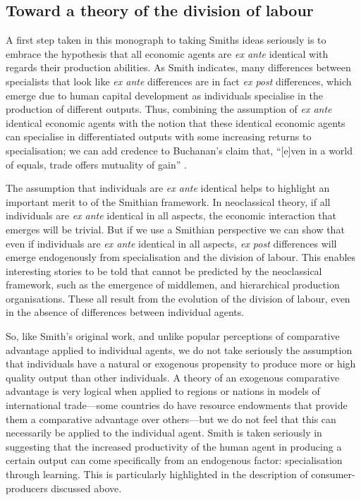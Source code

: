 \subsection{Toward a theory of the division of labour}

A first step taken in this monograph to taking Smiths ideas seriously is to embrace the hypothesis that all economic agents are \textit{ex ante} identical with regards their production abilities. As Smith indicates, many differences between specialists that look like \textit{ex ante} differences are in fact \textit{ex post} differences, which emerge due to human capital development as individuals specialise in the production of different outputs. Thus, combining the assumption of \textit{ex ante} identical economic agents with the notion that these identical economic agents can specialise in differentiated outputs with some increasing returns to specialisation; we can add credence to Buchanan's claim that, ``[e]ven in a world of equals, trade offers mutuality of gain'' \citep[p.~43]{BuchananYoon2000}.

The assumption that individuals are \textit{ex ante} identical helps to highlight an important merit to of the Smithian framework. In neoclassical theory, if all individuals are \textit{ex ante} identical in all aspects, the economic interaction that emerges will be trivial. But if we use a Smithian perspective we can show that even if individuals are \textit{ex ante} identical in all aspects, \textit{ex post} differences will emerge endogenously from specialisation and the division of labour. This enables interesting stories to be told that cannot be predicted by the neoclassical framework, such as the emergence of middlemen, and hierarchical production organisations. These all result from the evolution of the division of labour, even in the absence of differences between individual agents.

So, like Smith's original work, and unlike popular perceptions of comparative advantage applied to individual agents, we do not take seriously the assumption that individuals have a natural or exogenous propensity to produce more or high quality output than other individuals. A theory of an exogenous comparative advantage is very logical when applied to regions or nations in models of international trade---some countries do have resource endowments that provide them a comparative advantage over others---but we do not feel that this can necessarily be applied to the individual agent. Smith is taken seriously in suggesting that the increased productivity of the human agent in producing a certain output can come specifically from an endogenous factor: specialisation through learning. This is particularly highlighted in the description of consumer-producers discussed above. 

